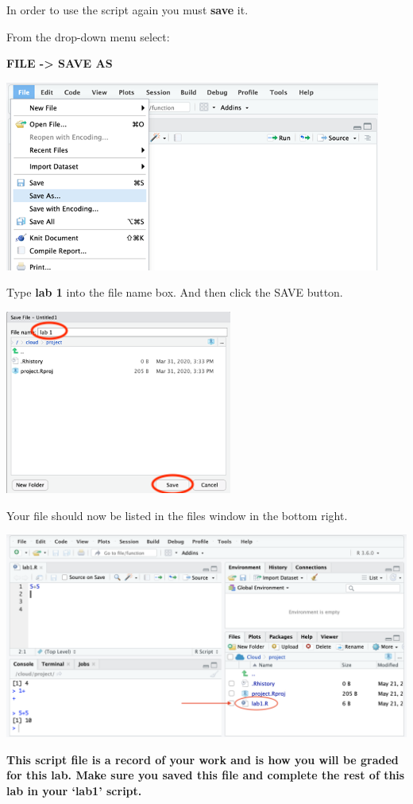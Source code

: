 \documentclass[
]{book}
\begin{document}
In order to use the script again you must \textbf{save} it.

From the drop-down menu select:

\textbf{FILE -\textgreater{} SAVE AS}

\includegraphics{img/savescript.png}

Type \textbf{lab 1} into the file name box. And then click the SAVE button.

\includegraphics{img/savescript2.png}

Your file should now be listed in the files window in the bottom right.

\includegraphics{img/savescript3.png}

\textbf{This script file is a record of your work and is how you will be graded for this lab. Make sure you saved this file and complete the rest of this lab in your `lab1' script.}
\end{document}
